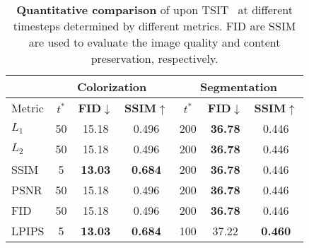 \setlength{\tabcolsep}{8pt}
\begin{table*}[!ht]
\footnotesize
\centering
\caption{
    \textbf{Quantitative comparison} of \method upon TSIT~\cite{jiang2020tsit} at different timesteps determined by different metrics.
    FID are SSIM are used to evaluate the image quality and content preservation, respectively.
}
\label{tab:ablation_t_rebuttal}
\vspace{-2pt}
\begin{tabular}{l|ccc|ccc}
\toprule
       & \multicolumn{3}{c|}{Colorization} & \multicolumn{3}{c|}{Segmentation} \\
\midrule
Metric  & $t^*$ & \textbf{FID$\downarrow$} & \textbf{SSIM$\uparrow$} & $t^*$ & \textbf{FID$\downarrow$} & \textbf{SSIM$\uparrow$} \\
\midrule
                        $L_1$ & 50 &     15.18 &     0.496 & 200 & \bf 36.78 &     0.446 \\
                        $L_2$ & 50 &     15.18 &     0.496 & 200 & \bf 36.78 &     0.446 \\
\rowcolor{lightgray!30} SSIM  &  5 & \bf 13.03 & \bf 0.684 & 200 & \bf 36.78 &     0.446 \\
                        PSNR  & 50 &     15.18 &     0.496 & 200 & \bf 36.78 &     0.446 \\
                        FID   & 50 &     15.18 &     0.496 & 200 & \bf 36.78 &     0.446 \\
                        LPIPS &  5 & \bf 13.03 & \bf 0.684 & 100 &     37.22 & \bf 0.460 \\
\bottomrule
\end{tabular}
\end{table*}

